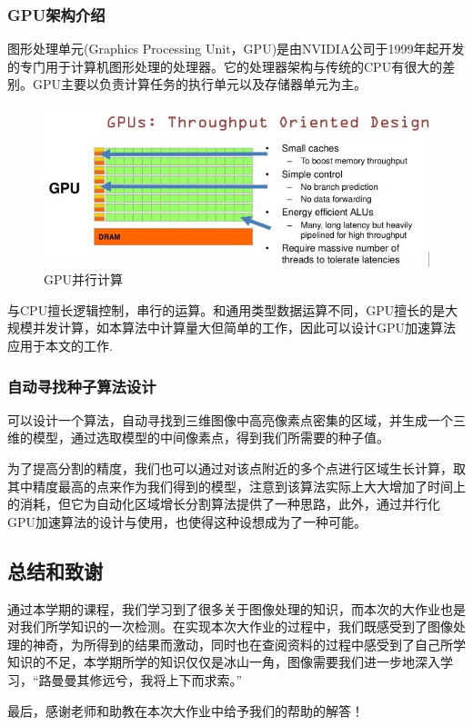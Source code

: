 \documentclass[UTF8]{ctexart}
\begin{document}
	\subsubsection*{GPU架构介绍}

    图形处理单元(Graphics Processing Unit，GPU)是由NVIDIA公司于1999年起开发的专门用于计算机图形处理的处理器。它的处理器架构与传统的CPU有很大的差别。GPU主要以负责计算任务的执行单元以及存储器单元为主。
    
    \begin{figure}[H]
        \centering  %
        \includegraphics[scale=0.4]{figure/Gpu structure.jpg}
        \caption{GPU并行计算}
    \end{figure}

	与CPU擅长逻辑控制，串行的运算。和通用类型数据运算不同，GPU擅长的是大规模并发计算，如本算法中计算量大但简单的工作，因此可以设计GPU加速算法应用于本文的工作.
	
	\subsubsection{自动寻找种子算法设计}

	可以设计一个算法，自动寻找到三维图像中高亮像素点密集的区域，并生成一个三维的模型，通过选取模型的中间像素点，得到我们所需要的种子值。

	为了提高分割的精度，我们也可以通过对该点附近的多个点进行区域生长计算，取其中精度最高的点来作为我们得到的模型，注意到该算法实际上大大增加了时间上的消耗，但它为自动化区域增长分割算法提供了一种思路，此外，通过并行化GPU加速算法的设计与使用，也使得这种设想成为了一种可能。

	\subsection{总结和致谢}

    通过本学期的课程，我们学习到了很多关于图像处理的知识，而本次的大作业也是对我们所学知识的一次检测。在实现本次大作业的过程中，我们既感受到了图像处理的神奇，为所得到的结果而激动，同时也在查阅资料的过程中感受到了自己所学知识的不足，本学期所学的知识仅仅是冰山一角，图像需要我们进一步地深入学习，“路曼曼其修远兮，我将上下而求索。”
    
    最后，感谢老师和助教在本次大作业中给予我们的帮助的解答！
\end{document}
